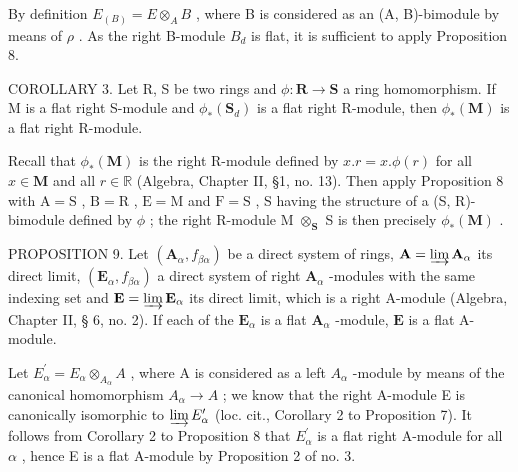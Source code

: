By definition \(E_{(B)} = E \otimes_{A} B\) , where B is considered as an (A, B)-bimodule by means of \(\rho\) . As the right B-module \(B_{d}\) is flat, it is sufficient to apply Proposition 8.

COROLLARY 3. Let R, S be two rings and \(\phi: \mathbf{R} \to \mathbf{S}\) a ring homomorphism. If M is a flat right S-module and \(\phi_*(\mathbf{S}_d)\) is a flat right R-module, then \(\phi_*(\mathbf{M})\) is a flat right R-module.

Recall that \(\phi_{*}(\mathbf{M})\) is the right R-module defined by \(x.r = x.\phi (r)\) for all \(x\in \mathbf{M}\) and all \(r\in \mathbb{R}\) (Algebra, Chapter II, §1, no. 13). Then apply Proposition 8 with \(\mathrm{A} = \mathrm{S}\) , \(\mathrm{B} = \mathrm{R}\) , \(\mathrm{E} = \mathrm{M}\) and \(\mathrm{F} = \mathrm{S}\) , S having the structure of a (S, R)-bimodule defined by \(\phi\) ; the right R-module M \(\otimes_{\mathbf{S}}\) S is then precisely \(\phi_{*}(\mathbf{M})\) .

PROPOSITION 9. Let \((\mathbf{A}_{\alpha}, f_{\beta \alpha})\) be a direct system of rings, \(\mathbf{A} = \varinjlim \mathbf{A}_{\alpha}\) its direct limit, \((\mathbf{E}_{\alpha}, f_{\beta \alpha})\) a direct system of right \(\mathbf{A}_{\alpha}\) -modules with the same indexing set and \(\mathbf{E} = \varinjlim \mathbf{E}_{\alpha}\) its direct limit, which is a right A-module (Algebra, Chapter II, § 6, no. 2). If each of the \(\mathbf{E}_{\alpha}\) is a flat \(\mathbf{A}_{\alpha}\) -module, \(\mathbf{E}\) is a flat A-module.

Let \(E_{\alpha}^{\prime}=E_{\alpha}\otimes_{A_{\alpha}}A\) , where A is considered as a left \(A_{\alpha}\) -module by means of the canonical homomorphism \(A_{\alpha}\to A\) ; we know that the right A-module E is canonically isomorphic to \(\varinjlim E_{\alpha}^{\prime}\) (loc. cit., Corollary 2 to Proposition 7). It follows from Corollary 2 to Proposition 8 that \(E_{\alpha}^{\prime}\) is a flat right A-module for all \(\alpha\) , hence E is a flat A-module by Proposition 2 of no. 3.

